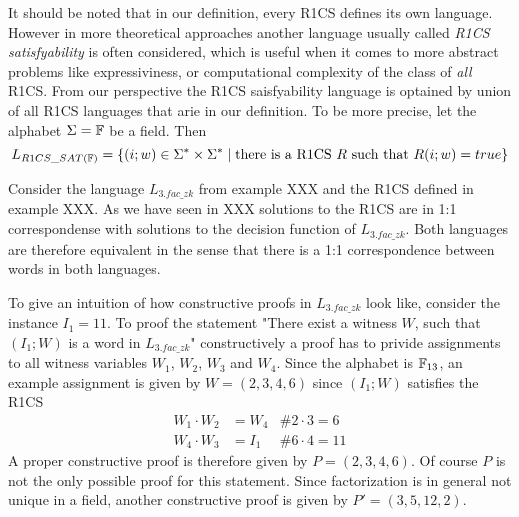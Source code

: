 \begin{remark}[R1CS satisfyability] It should be noted that in our definition, every R1CS defines its own language. However in more theoretical approaches another language usually called \textit{R1CS satisfyability} is often considered, which is useful when it comes to more abstract problems like expressiviness, or computational complexity of the class of \textit{all} R1CS. From our perspective the R1CS saisfyability language is optained by union of all R1CS languages that arie in our definition. To be more precise, let the alphabet $\Sigma=\mathbb{F}$ be a field. Then 
$$
L_{R1CS\_SAT(\mathbb{F})} = \{(i;w)\in \Sigma^*\times \Sigma^*\;|\; \text{there is a R1CS $R$ such that } R(i;w)=true  \}
$$
\end{remark}
\begin{example}[3-Factorization]Consider the language $L_{3.fac\_zk}$ from example XXX and the R1CS defined in example XXX. As we have seen in XXX solutions to the R1CS are in 1:1 correspondense with solutions to the decision function of $L_{3.fac\_zk}$. Both languages are therefore equivalent in the sense that there is a 1:1 correspondence between words in both languages.

To give an intuition of how constructive proofs in $L_{3.fac\_zk}$ look like, consider the instance $I_1= 11$. To proof the statement "There exist a witness $W$, such that $(I_1;W)$ is a word in $L_{3.fac\_zk}$" constructively a proof has to privide assignments to all witness variables $W_1$, $W_2$, $W_3$ and $W_4$. Since the alphabet is $\mathbb{F}_{13}$, an example assignment is given by
$W=(2,3,4,6)$ since $(I_1;W)$ satisfies the R1CS
\begin{align*}
W_1 \cdot W_2 &= W_4 & \text{\# } 2\cdot 3 = 6\\
W_4 \cdot W_3 &= I_1 & \text{\# } 6\cdot 4 = 11
\end{align*}
A proper constructive proof is therefore given by $P=(2,3,4,6)$. Of course $P$ is not the only possible proof for this statement. Since factorization is in general not unique in a field, another constructive proof is given by $P'=(3,5,12,2)$. 
\end{example}
